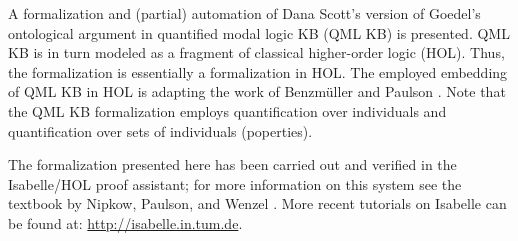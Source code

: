 %
\begin{isabellebody}%
\def\isabellecontext{GoedelGod}%
%
\isadelimtheory
%
\endisadelimtheory
%
\isatagtheory
%
\endisatagtheory
{\isafoldtheory}%
%
\isadelimtheory
%
\endisadelimtheory
%
\isamarkuptrue%
%
\begin{isamarkuptext}%
A formalization and (partial) automation of Dana Scott's version \cite{ScottNotes}
 of Goedel's ontological argument \cite{GoedelNotes} in quantified modal logic KB (QML KB) is
 presented. QML KB is in turn modeled as a fragment of classical higher-order logic (HOL). 
 Thus, the formalization is essentially a formalization in HOL. The employed embedding 
 of QML KB in HOL is adapting the work of Benzm\"uller and Paulson \cite{J23,B9}.
 Note that the QML KB formalization employs quantification over individuals and 
 quantification over sets of individuals (poperties).

 The formalization presented here has been carried out and verified in the Isabelle/HOL 
 proof assistant; for more information on this system see the textbook by Nipkow, 
 Paulson, and Wenzel \cite{Isabelle}. More recent tutorials on Isabelle can be found 
 at: \url{http://isabelle.in.tum.de}.
 


\end{isamarkuptext}
\end{isabellebody}
